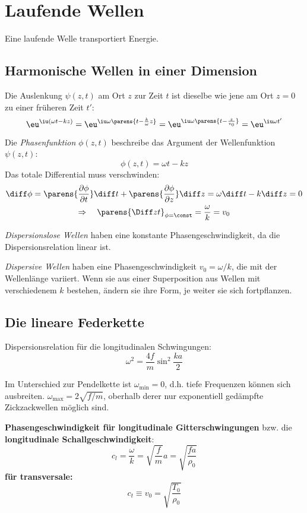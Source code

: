 \section{Laufende Wellen} %
	Eine laufende Welle transportiert Energie.
	\subsection{Harmonische Wellen in einer Dimension} %
		Die Auslenkung $\psi(z,t)$ am Ort $z$ zur Zeit $t$ ist dieselbe wie jene am Ort $z=0$ zu einer früheren Zeit $t'$:
		\[
			\eu^{\iu(\omega t - k z)} = \eu^{\iu \omega\parens{t-\frac k \omega z}} = \eu^{\iu\omega\parens{t-\frac{z}{v_0}}} = \eu^{\iu\omega t'}
		\]
		
		Die \emph{Phasenfunktion} $\phi(z,t)$ beschreibe das Argument der Wellenfunktion $\psi(z,t)$:
		\[
			\phi(z,t) = \omega t - k z
		\]
		Das totale Differential muss verschwinden:
		\begin{gather*}
			\diff \phi = \parens{\frac{\partial\phi}{\partial t}} \diff t + \parens{\frac{\partial \phi}{\partial z}} \diff z = \omega \diff t - k \diff z = 0 \\
			\Rightarrow \quad \parens{\Diff z t}_{\phi = \const} = \frac \omega k = v_0
		\end{gather*}    
		
		\emph{Dispersionslose Wellen} haben eine konstante Phasengeschwindigkeit, da die Dispersionsrelation linear ist.
		
		\emph{Dispersive Wellen} haben eine Phasengeschwindigkeit $v_0 = \omega/k$, die mit der Wellenlänge variiert. Wenn sie aus einer Superposition aus Wellen mit verschiedenem $k$ bestehen, ändern sie ihre Form, je weiter sie sich fortpflanzen.
	\subsection{Die lineare Federkette} %
		Dispersionsrelation für die longitudinalen Schwingungen:
		\[
			\omega^2 = \frac{4f}{m} \sin^2 \frac{ka}{2}
		\]
		
		Im Unterschied zur Pendelkette ist $\omega_\text{min} = 0$, d.h.  tiefe Frequenzen können sich ausbreiten. $\omega_\text{max} = 2\sqrt{f/m}$, oberhalb derer nur exponentiell gedämpfte Zickzackwellen möglich sind.
		
		\textbf{Phasengeschwindigkeit für longitudinale Gitterschwingungen} bzw. die \textbf{longitudinale Schallgeschwindigkeit}:
		\[
			c_l = \frac \omega k = \sqrt{\frac f m} a = \sqrt{\frac{fa}{\rho_0}}
		\]
		\textbf{für transversale:}
		\[
			c_t \equiv v_0 = \sqrt{\frac{T_0}{\rho_0}}
		\]
		
